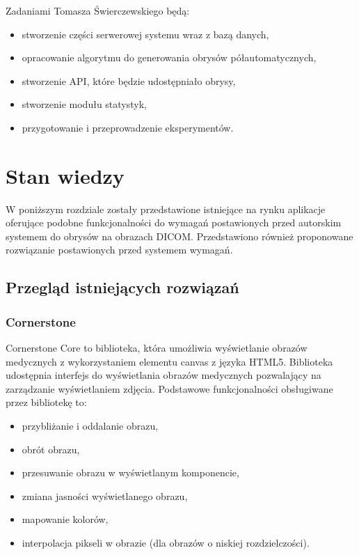 \documentclass[a4paper,11pt,twoside,openright]{report}
\theoremstyle{definition}
\begin{document}
Zadaniami Tomasza Świerczewskiego będą:
\begin{itemize}[noitemsep]
\item stworzenie części serwerowej systemu wraz z bazą danych,
\item opracowanie algorytmu do generowania obrysów półautomatycznych,
\item stworzenie API, które będzie udostępniało obrysy,
\item stworzenie modułu statystyk,
\item przygotowanie i przeprowadzenie eksperymentów.
\end{itemize}


\chapter {Stan wiedzy}

W poniższym rozdziale zostały przedstawione istniejące na rynku aplikacje oferujące podobne funkcjonalności do wymagań postawionych przed autorskim systemem do obrysów na obrazach DICOM. Przedstawiono również proponowane rozwiązanie postawionych przed systemem wymagań.

\section {Przegląd istniejących rozwiązań}

\subsection {Cornerstone}

Cornerstone Core \cite{Cornerstone Core} to biblioteka, która umożliwia wyświetlanie obrazów medycznych z wykorzystaniem elementu canvas z języka HTML5. Biblioteka udostępnia interfejs do wyświetlania obrazów medycznych pozwalający na zarządzanie wyświetlaniem zdjęcia. Podstawowe funkcjonalności obsługiwane przez bibliotekę to:

\begin{itemize}[noitemsep]
\item przybliżanie i oddalanie obrazu,
\item obrót obrazu,
\item przesuwanie obrazu w wyświetlanym komponencie,
\item zmiana jasności wyświetlanego obrazu,
\item mapowanie kolorów,
\item interpolacja pikseli w obrazie (dla obrazów o niskiej rozdzielczości).
\end{itemize}
\end{document}
